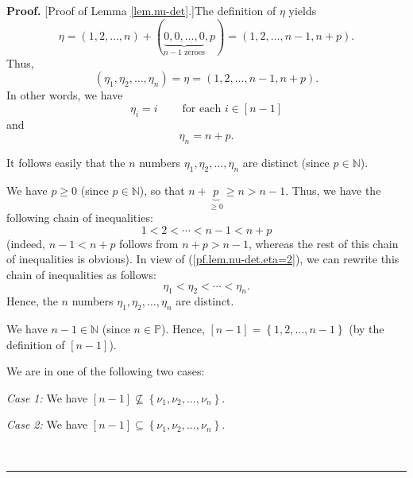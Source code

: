 \documentclass
[numbers=enddot,12pt,final,onecolumn,notitlepage,english]{scrartcl}%
\theoremstyle{definition}
\newenvironment{proof}[1][Proof]{\noindent\textbf{#1.} }{\ \rule{0.5em}{0.5em}}
\newenvironment{verlong}{}{}
\newenvironment{vershort}{}{}
\begin{document}
\begin{proof}
[Proof of Lemma \ref{lem.nu-det}.]The definition of $\eta$ yields%
\begin{equation}
\eta=\left(  1,2,\ldots,n\right)  +\left(  \underbrace{0,0,\ldots
,0}_{n-1\text{ zeroes}},p\right)  =\left(  1,2,\ldots,n-1,n+p\right)
.\nonumber
\end{equation}
Thus,%
\begin{equation}
\left(  \eta_{1},\eta_{2},\ldots,\eta_{n}\right)  =\eta=\left(  1,2,\ldots
,n-1,n+p\right)  . \label{pf.lem.nu-det.eta=2}%
\end{equation}
In other words, we have%
\begin{equation}
\eta_{i}=i\ \ \ \ \ \ \ \ \ \ \text{for each }i\in\left[  n-1\right]
\label{pf.lem.nu-det.etai=}%
\end{equation}
and%
\begin{equation}
\eta_{n}=n+p. \label{pf.lem.nu-det.etan=}%
\end{equation}


\begin{vershort}
\noindent It follows easily that the $n$ numbers $\eta_{1},\eta_{2}%
,\ldots,\eta_{n}$ are distinct (since $p\in\mathbb{N}$).
\end{vershort}

\begin{verlong}
We have $p\geq0$ (since $p\in\mathbb{N}$), so that $n+\underbrace{p}_{\geq
0}\geq n>n-1$. Thus, we have the following chain of inequalities:%
\[
1<2<\cdots<n-1<n+p
\]
(indeed, $n-1<n+p$ follows from $n+p>n-1$, whereas the rest of this chain of
inequalities is obvious). In view of (\ref{pf.lem.nu-det.eta=2}), we can
rewrite this chain of inequalities as follows:
\[
\eta_{1}<\eta_{2}<\cdots<\eta_{n}.
\]
Hence, the $n$ numbers $\eta_{1},\eta_{2},\ldots,\eta_{n}$ are distinct.
\end{verlong}

\begin{verlong}
We have $n-1\in\mathbb{N}$ (since $n\in\mathbb{P}$). Hence, $\left[
n-1\right]  =\left\{  1,2,\ldots,n-1\right\}  $ (by the definition of $\left[
n-1\right]  $). \medskip
\end{verlong}

We are in one of the following two cases:

\textit{Case 1:} We have $\left[  n-1\right]  \not \subseteq \left\{  \nu
_{1},\nu_{2},\ldots,\nu_{n}\right\}  $.

\textit{Case 2:} We have $\left[  n-1\right]  \subseteq\left\{  \nu_{1}%
,\nu_{2},\ldots,\nu_{n}\right\}  $. \medskip


\end{proof}
\end{document}
